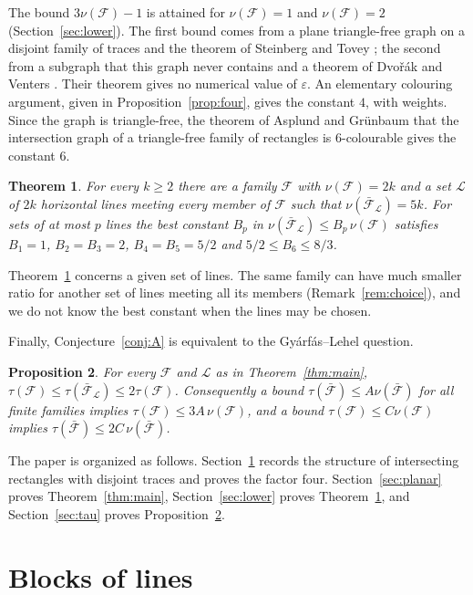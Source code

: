 \documentclass[11pt]{article}
\newtheorem{theorem}{Theorem}
\newtheorem{proposition}[theorem]{Proposition}
\theoremstyle{remark}
\newcommand{\F}{\mathcal{F}}
\newcommand{\Fb}{\bar{\mathcal{F}}}
\newcommand{\cL}{\mathcal{L}}
\begin{document}
The bound $3\nu(\F)-1$ is attained for $\nu(\F)=1$ and $\nu(\F)=2$ (Section~\ref{sec:lower}). The first bound comes from a plane triangle-free graph on a disjoint family of traces and the theorem of Steinberg and Tovey \cite{ST}; the second from a subgraph that this graph never contains and a theorem of Dvo\v{r}\'ak and Venters \cite{DV}. Their theorem gives no numerical value of $\varepsilon$. An elementary colouring argument, given in Proposition~\ref{prop:four}, gives the constant $4$, with weights. Since the graph is triangle-free, the theorem of Asplund and Gr\"unbaum \cite{AsG} that the intersection graph of a triangle-free family of rectangles is $6$-colourable gives the constant $6$.

\begin{theorem}\label{thm:lower}
For every $k\ge2$ there are a family $\F$ with $\nu(\F)=2k$ and a set $\cL$ of $2k$ horizontal lines meeting every member of $\F$ such that $\nu(\Fb_\cL)=5k$. For sets of at most $p$ lines the best constant $B_p$ in $\nu(\Fb_\cL)\le B_p\,\nu(\F)$ satisfies $B_1=1$, $B_2=B_3=2$, $B_4=B_5=5/2$ and $5/2\le B_6\le 8/3$.
\end{theorem}

Theorem~\ref{thm:lower} concerns a given set of lines. The same family can have much smaller ratio for another set of lines meeting all its members (Remark~\ref{rem:choice}), and we do not know the best constant when the lines may be chosen.

Finally, Conjecture~\ref{conj:A} is equivalent to the Gy\'arf\'as--Lehel question.

\begin{proposition}\label{prop:tau}
For every $\F$ and $\cL$ as in Theorem~\ref{thm:main}, $\tau(\F)\le\tau(\Fb_\cL)\le2\tau(\F)$. Consequently a bound $\tau(\Fb)\le A\nu(\Fb)$ for all finite families implies $\tau(\F)\le 3A\,\nu(\F)$, and a bound $\tau(\F)\le C\nu(\F)$ implies $\tau(\Fb)\le 2C\,\nu(\Fb)$.
\end{proposition}

The paper is organized as follows. Section~\ref{sec:blocks} records the structure of intersecting rectangles with disjoint traces and proves the factor four. Section~\ref{sec:planar} proves Theorem~\ref{thm:main}, Section~\ref{sec:lower} proves Theorem~\ref{thm:lower}, and Section~\ref{sec:tau} proves Proposition~\ref{prop:tau}.

\section{Blocks of lines}\label{sec:blocks}
\end{document}
